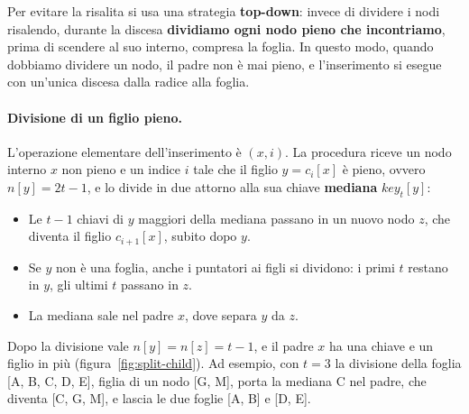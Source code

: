 Per evitare la risalita si usa una strategia \textbf{top-down}: invece di dividere i nodi risalendo, durante la discesa \textbf{dividiamo ogni nodo pieno che incontriamo}, prima di scendere al suo interno, compresa la foglia. In questo modo, quando dobbiamo dividere un nodo, il padre non è mai pieno, e l'inserimento si esegue con un'unica discesa dalla radice alla foglia.

\paragraph{Divisione di un figlio pieno.}
L'operazione elementare dell'inserimento è \BTreeSplitChild$(x,i)$. La procedura riceve un nodo interno $x$ non pieno e un indice $i$ tale che il figlio $y = c_i[x]$ è pieno, ovvero $n[y] = 2t-1$, e lo divide in due attorno alla sua chiave \textbf{mediana} $\mathit{key}_t[y]$:
\begin{itemize}
    \item Le $t-1$ chiavi di $y$ maggiori della mediana passano in un nuovo nodo $z$, che diventa il figlio $c_{i+1}[x]$, subito dopo $y$.
    \item Se $y$ non è una foglia, anche i puntatori ai figli si dividono: i primi $t$ restano in $y$, gli ultimi $t$ passano in $z$.
    \item La mediana sale nel padre $x$, dove separa $y$ da $z$.
\end{itemize}
Dopo la divisione vale $n[y] = n[z] = t-1$, e il padre $x$ ha una chiave e un figlio in più (figura~\ref{fig:split-child}). Ad esempio, con $t = 3$ la divisione della foglia [A, B, C, D, E], figlia di un nodo [G, M], porta la mediana C nel padre, che diventa [C, G, M], e lascia le due foglie [A, B] e [D, E].

